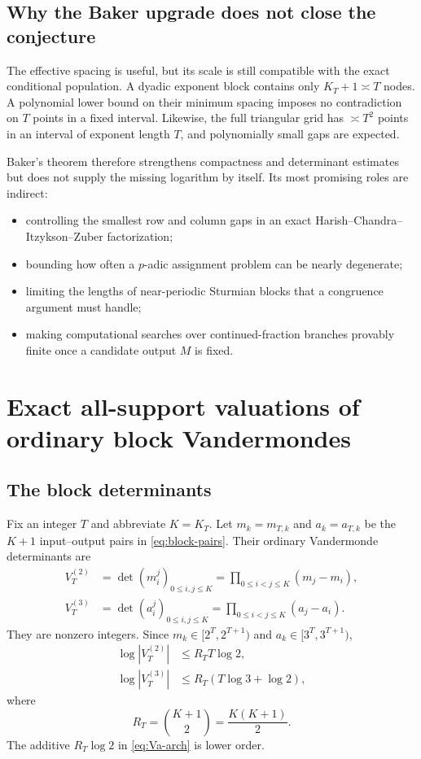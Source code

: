 \documentclass[11pt,oneside]{article}
\theoremstyle{definition}
\theoremstyle{remark}
\begin{document}
\subsection{Why the Baker upgrade does not close the conjecture}

The effective spacing is useful, but its scale is still compatible with the exact conditional
population.  A dyadic exponent block contains only $K_T+1\asymp T$ nodes.  A polynomial lower
bound on their minimum spacing imposes no contradiction on $T$ points in a fixed interval.
Likewise, the full triangular grid has $\asymp T^2$ points in an interval of exponent length
$T$, and polynomially small gaps are expected.

Baker's theorem therefore strengthens compactness and determinant estimates but does not
supply the missing logarithm by itself.  Its most promising roles are indirect:

\begin{itemize}
\item controlling the smallest row and column gaps in an exact Harish--Chandra--Itzykson--Zuber
      factorization;
\item bounding how often a $p$-adic assignment problem can be nearly degenerate;
\item limiting the lengths of near-periodic Sturmian blocks that a congruence argument must
      handle;
\item making computational searches over continued-fraction branches provably finite once a
      candidate output $M$ is fixed.
\end{itemize}

\section{Exact all-support valuations of ordinary block Vandermondes}

\subsection{The block determinants}

Fix an integer $T$ and abbreviate $K=K_T$.  Let $m_k=m_{T,k}$ and $a_k=a_{T,k}$ be the
$K+1$ input--output pairs in \eqref{eq:block-pairs}.  Their ordinary Vandermonde determinants
are
\begin{align}
  V_T^{(2)}&=\det(m_i^j)_{0\le i,j\le K}
            =\prod_{0\le i<j\le K}(m_j-m_i),\label{eq:Vm}\\
  V_T^{(3)}&=\det(a_i^j)_{0\le i,j\le K}
            =\prod_{0\le i<j\le K}(a_j-a_i).
  \label{eq:Va}
\end{align}
They are nonzero integers.  Since $m_k\in[2^T,2^{T+1})$ and
$a_k\in[3^T,3^{T+1})$,
\begin{align}
  \log|V_T^{(2)}|&\le R_TT\log2,\label{eq:Vm-arch}\\
  \log|V_T^{(3)}|&\le R_T(T\log3+\log2),\label{eq:Va-arch}
\end{align}
where
\[
  R_T=\binom{K+1}{2}=\frac{K(K+1)}2.
\]
The additive $R_T\log2$ in \eqref{eq:Va-arch} is lower order.
\end{document}
